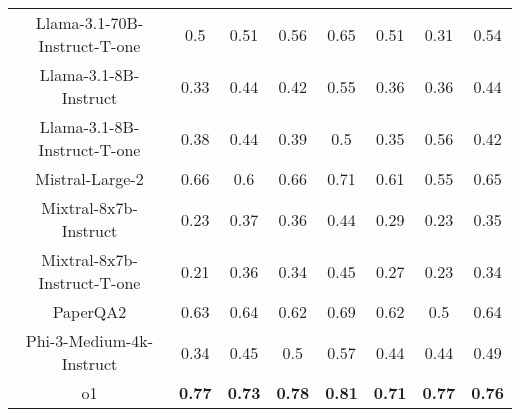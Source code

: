 \begin{tabular}{cccccccc}
Llama-3.1-70B-Instruct-T-one & 0.5 & 0.51 & 0.56 & 0.65 & 0.51 & 0.31 & 0.54 \\
Llama-3.1-8B-Instruct & 0.33 & 0.44 & 0.42 & 0.55 & 0.36 & 0.36 & 0.44 \\
Llama-3.1-8B-Instruct-T-one & 0.38 & 0.44 & 0.39 & 0.5 & 0.35 & 0.56 & 0.42 \\
Mistral-Large-2 & 0.66 & 0.6 & 0.66 & 0.71 & 0.61 & 0.55 & 0.65 \\
Mixtral-8x7b-Instruct & 0.23 & 0.37 & 0.36 & 0.44 & 0.29 & 0.23 & 0.35 \\
Mixtral-8x7b-Instruct-T-one & 0.21 & 0.36 & 0.34 & 0.45 & 0.27 & 0.23 & 0.34 \\
PaperQA2 & 0.63 & 0.64 & 0.62 & 0.69 & 0.62 & 0.5 & 0.64 \\
Phi-3-Medium-4k-Instruct & 0.34 & 0.45 & 0.5 & 0.57 & 0.44 & 0.44 & 0.49 \\
o1 & \textbf{0.77} & \textbf{0.73} & \textbf{0.78} & \textbf{0.81} & \textbf{0.71} & \textbf{0.77} & \textbf{0.76} \\
\bottomrule
\end{tabular}
